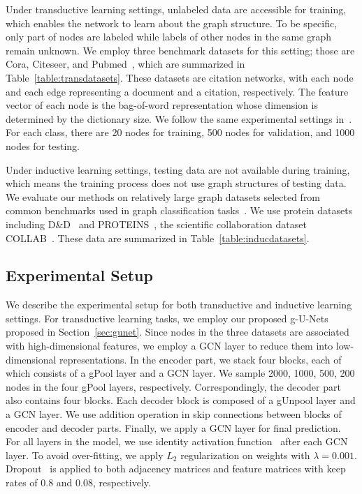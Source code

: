 \documentclass{article}
\begin{document}
Under transductive learning settings,
unlabeled data are accessible for training, which enables the
network to learn about the graph structure. To be specific, only
part of nodes are labeled while labels of other nodes in the same
graph remain unknown. We employ three benchmark datasets for this
setting; those are Cora, Citeseer, and Pubmed~\citep{kipf2016semi},
which are summarized in Table~\ref{table:transdatasets}. These datasets
are citation networks, with each node and each edge representing a
document and a citation, respectively. The feature vector of each
node is the bag-of-word representation whose dimension is determined
by the dictionary size. We follow the same experimental settings
in~\citep{kipf2016semi}. For each class, there are 20 nodes for
training, 500 nodes for validation, and 1000 nodes for testing.

Under inductive learning settings, testing data are
not available during training, which means the training process does
not use graph structures of testing data. We evaluate our methods on
relatively large graph datasets selected from common benchmarks used
in graph classification
tasks~\citep{ying2018hierarchical,niepert2016learning,zhang2018end}.
We use protein datasets including
D\&D~\citep{dobson2003distinguishing} and
PROTEINS~\citep{borgwardt2005protein}, the scientific collaboration
dataset COLLAB~\citep{yanardag2015structural}. These data are
summarized in Table~\ref{table:inducdatasets}.

\subsection{Experimental Setup}



We describe the experimental setup for both transductive and inductive
learning settings. For transductive learning tasks, we employ our proposed
g-U-Nets proposed in Section~\ref{sec:gunet}. Since nodes in the three
datasets are associated with high-dimensional features, we employ a GCN layer
to reduce them into low-dimensional representations. In the encoder part, we
stack four blocks, each of which consists of a gPool layer and a GCN layer. We
sample 2000, 1000, 500, 200 nodes in the four gPool layers, respectively.
Correspondingly, the decoder part also contains four blocks. Each decoder
block is composed of a gUnpool layer and a GCN layer. We use addition
operation in skip connections between blocks of encoder and decoder parts.
Finally, we apply a GCN layer for final prediction. For all layers in the
model, we use identity activation function~\cite{gao2018large} after each
GCN layer. To avoid
over-fitting, we apply $L_2$ regularization on weights with $\lambda=0.001$.
Dropout~\citep{srivastava2014dropout} is applied to both adjacency matrices
and feature matrices with keep rates of 0.8 and 0.08, respectively.
\end{document}
